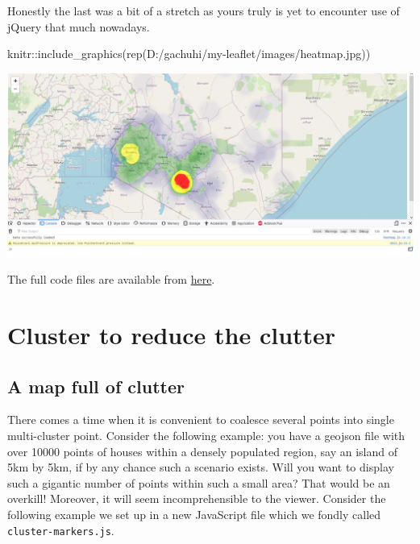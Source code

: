 \documentclass[
]{book}
\newenvironment{Shaded}{\begin{snugshade}}{\end{snugshade}}
\newcommand{\FunctionTok}[1]{\textcolor[rgb]{0.00,0.00,0.00}{#1}}
\newcommand{\NormalTok}[1]{#1}
\newcommand{\SpecialCharTok}[1]{\textcolor[rgb]{0.00,0.00,0.00}{#1}}
\newcommand{\StringTok}[1]{\textcolor[rgb]{0.31,0.60,0.02}{#1}}
\begin{document}
Honestly the last was a bit of a stretch as yours truly is yet to encounter use of jQuery that much nowadays.

\begin{Shaded}
\begin{Highlighting}[]
\NormalTok{knitr}\SpecialCharTok{::}\FunctionTok{include\_graphics}\NormalTok{(}\FunctionTok{rep}\NormalTok{(}\StringTok{\textquotesingle{}D:/gachuhi/my{-}leaflet/images/heatmap.jpg\textquotesingle{}}\NormalTok{))}
\end{Highlighting}
\end{Shaded}

\includegraphics[width=26.57in]{../images/heatmap}

The full code files are available from \href{https://www.dropbox.com/scl/fo/cgfftdcw8u7lqyqfu38gu/h?dl=0\&rlkey=7ywjiud4vo24llrx192rvgf4d}{here}.

\hypertarget{cluster-to-reduce-the-clutter}{%
\chapter{Cluster to reduce the clutter}\label{cluster-to-reduce-the-clutter}}

\hypertarget{a-map-full-of-clutter}{%
\section{A map full of clutter}\label{a-map-full-of-clutter}}

There comes a time when it is convenient to coalesce several points into single multi-cluster point. Consider the following example: you have a geojson file with over 10000 points of houses within a densely populated region, say an island of 5km by 5km, if by any chance such a scenario exists. Will you want to display such a gigantic number of points within such a small area? That would be an overkill! Moreover, it will seem incomprehensible to the viewer. Consider the following example we set up in a new JavaScript file which we fondly called \texttt{cluster-markers.js}.
\end{document}
